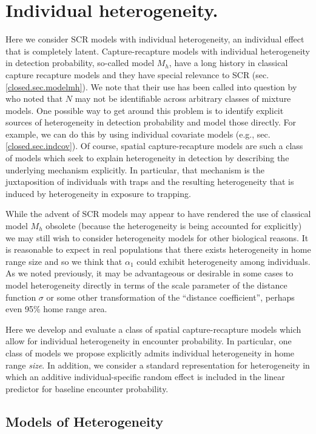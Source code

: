 \section{Individual heterogeneity.}

Here we consider SCR models with individual heterogeneity, an
individual effect that is
completely latent.  Capture-recapture models with individual
heterogeneity in detection probability, so-called model $M_{h}$, have
a long history in classical capture recapture models and they have
special relevance to SCR (sec. \ref{closed.sec.modelmh}).
We note that their use has been called into question by
\citet{link:2003} who noted that $N$ may not be identifiable across
arbitrary classes of mixture models.  One possible way to get around
this problem is to identify explicit sources of heterogeneity in
detection probability and model those directly. For example, we can do
this by using individual covariate models (e.g.,
sec. \ref{closed.sec.indcov}). Of course, spatial capture-recapture
models are such a class of models which seek to explain heterogeneity
in detection by describing the underlying mechanism explicitly. In
particular, that mechanism is the juxtaposition of individuals with
traps and the resulting heterogeneity that is induced by heterogeneity
in exposure to trapping.

While the advent of SCR models may appear to have rendered the use of
classical model $M_h$ obsolete (because the heterogeneity is being
accounted for explicitly) we may still wish to consider
heterogeneity models for other biological reasons.
It is reasonable
to expect in real populations that there exists
heterogeneity in home range size and so we think that $\alpha_{1}$
could exhibit heterogeneity among individuals.  As we noted
previously, it may be advantageous or desirable in some cases to model
heterogeneity directly in terms of the scale parameter of the distance
function $\sigma$ or
some other transformation of the ``distance coefficient'', perhaps
even 95\% home range area.

Here we develop and evaluate a class of spatial capture-recapture
models which allow for individual heterogeneity in encounter
probability.  In particular, one class of models we propose explicitly
admits individual heterogeneity in home range {\it size}. In addition,
we consider a standard representation for heterogeneity in which an
additive individual-specific random effect is included in the linear
predictor for baseline encounter probability.  

\subsection{Models of Heterogeneity}

